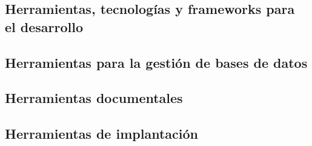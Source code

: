	\subsection{Herramientas, tecnologías y frameworks para el desarrollo}
	
	\subsection{Herramientas para la gestión de bases de datos}
	
	\subsection{Herramientas documentales}
	
	\subsection{Herramientas de implantación}


